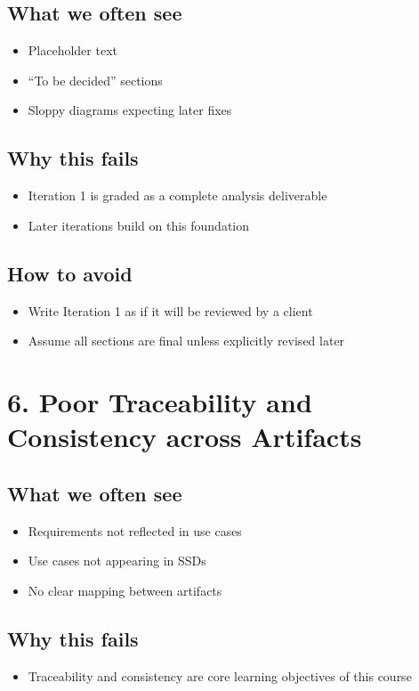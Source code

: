 \documentclass{article}
\begin{document}
\subsection*{What we often see}
\begin{itemize}[noitemsep]
    \item Placeholder text
    \item ``To be decided'' sections
    \item Sloppy diagrams expecting later fixes
\end{itemize}

\subsection*{Why this fails}
\begin{itemize}[noitemsep]
    \item Iteration 1 is graded as a complete analysis deliverable
    \item Later iterations build on this foundation
\end{itemize}

\subsection*{How to avoid}
\begin{itemize}[noitemsep]
    \item Write Iteration 1 as if it will be reviewed by a client
    \item Assume all sections are final unless explicitly revised later
\end{itemize}

\section*{6. Poor Traceability and Consistency across Artifacts}

\subsection*{What we often see}
\begin{itemize}[noitemsep]
    \item Requirements not reflected in use cases
    \item Use cases not appearing in SSDs
    \item No clear mapping between artifacts
\end{itemize}

\subsection*{Why this fails}
\begin{itemize}[noitemsep]
    \item Traceability and consistency are core learning objectives of this course
\end{itemize}
\end{document}
